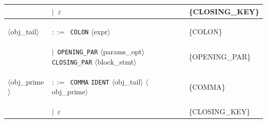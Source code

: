 \documentclass[10pt]{article}
\begin{document}
{\begin{longtable}{@{} p{2.0cm} p{6.9cm} p{6.9cm} @{}}
   & $\mid$~$\varepsilon$ & \{CLOSING\_KEY\} \\
  \midrule
  \textcolor{ntcolor}{\parbox[t]{1.8cm}{\raggedright$\langle$obj\_\allowbreak{}tail$\rangle$}} & $::=$~\texttt{COLON} $\langle$expr$\rangle$ & \{COLON\} \\
   & $\mid$~\texttt{OPENING\_PAR} $\langle$params\_opt$\rangle$ \texttt{CLOSING\_PAR} $\langle$block\_stmt$\rangle$ & \{OPENING\_PAR\} \\
  \midrule
  \textcolor{ntcolor}{\parbox[t]{1.8cm}{\raggedright$\langle$obj\_\allowbreak{}prime$\rangle$}} & $::=$~\texttt{COMMA} \texttt{IDENT} $\langle$obj\_tail$\rangle$ $\langle$obj\_prime$\rangle$ & \{COMMA\} \\
   & $\mid$~$\varepsilon$ & \{CLOSING\_KEY\} \\
  \midrule
  \bottomrule
\end{longtable}
}
\end{document}
